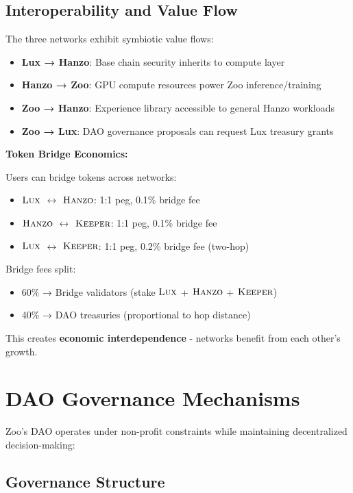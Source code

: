 \documentclass[11pt,letterpaper]{article}
\theoremstyle{definition}
\theoremstyle{remark}
\newcommand{\KEEPER}{\textsc{Keeper}}
\newcommand{\Hanzo}{\textsc{Hanzo}}
\newcommand{\Lux}{\textsc{Lux}}
\begin{document}
\subsection{Interoperability and Value Flow}

The three networks exhibit symbiotic value flows:

\begin{itemize}
\item \textbf{Lux → Hanzo}: Base chain security inherits to compute layer
\item \textbf{Hanzo → Zoo}: GPU compute resources power Zoo inference/training
\item \textbf{Zoo → Hanzo}: Experience library accessible to general Hanzo workloads
\item \textbf{Zoo → Lux}: DAO governance proposals can request Lux treasury grants
\end{itemize}

\textbf{Token Bridge Economics:}

Users can bridge tokens across networks:
\begin{itemize}
\item $\Lux$ $\leftrightarrow$ $\Hanzo$: 1:1 peg, 0.1\% bridge fee
\item $\Hanzo$ $\leftrightarrow$ $\KEEPER$: 1:1 peg, 0.1\% bridge fee
\item $\Lux$ $\leftrightarrow$ $\KEEPER$: 1:1 peg, 0.2\% bridge fee (two-hop)
\end{itemize}

Bridge fees split:
\begin{itemize}
\item 60\% → Bridge validators (stake $\Lux$ + $\Hanzo$ + $\KEEPER$)
\item 40\% → DAO treasuries (proportional to hop distance)
\end{itemize}

This creates \textbf{economic interdependence} - networks benefit from each other's growth.

\section{DAO Governance Mechanisms}

Zoo's DAO operates under non-profit constraints while maintaining decentralized decision-making:

\subsection{Governance Structure}
\end{document}
